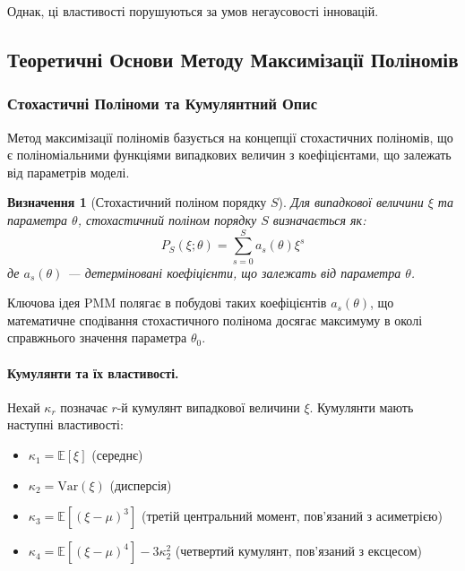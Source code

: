 \documentclass[12pt,a4paper]{article}
\newtheorem{definition}[theorem]{Визначення}
\begin{document}
Однак, ці властивості порушуються за умов негаусовості інновацій.

\subsection{Теоретичні Основи Методу Максимізації Поліномів}
\label{subsec:pmm_theory}

\subsubsection{Стохастичні Поліноми та Кумулянтний Опис}

Метод максимізації поліномів базується на концепції стохастичних поліномів, що є поліноміальними функціями випадкових величин з коефіцієнтами, що залежать від параметрів моделі.

\begin{definition}[Стохастичний поліном порядку $S$]
Для випадкової величини $\xi$ та параметра $\theta$, стохастичний поліном порядку $S$ визначається як:
\begin{equation}
\label{eq:stochastic_polynomial}
P_S(\xi; \theta) = \sum_{s=0}^{S} a_s(\theta) \xi^s
\end{equation}
де $a_s(\theta)$ --- детерміновані коефіцієнти, що залежать від параметра $\theta$.
\end{definition}

Ключова ідея PMM полягає в побудові таких коефіцієнтів $a_s(\theta)$, що математичне сподівання стохастичного полінома досягає максимуму в околі справжнього значення параметра $\theta_0$.

\paragraph{Кумулянти та їх властивості.}

Нехай $\kappa_r$ позначає $r$-й кумулянт випадкової величини $\xi$. Кумулянти мають наступні властивості:

\begin{itemize}
    \item $\kappa_1 = \mathbb{E}[\xi]$ (середнє)
    \item $\kappa_2 = \text{Var}(\xi)$ (дисперсія)
    \item $\kappa_3 = \mathbb{E}[(\xi - \mu)^3]$ (третій центральний момент, пов'язаний з асиметрією)
    \item $\kappa_4 = \mathbb{E}[(\xi - \mu)^4] - 3\kappa_2^2$ (четвертий кумулянт, пов'язаний з ексцесом)
\end{itemize}
\end{document}
